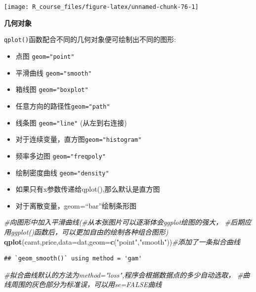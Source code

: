 \documentclass[]{article}
\newenvironment{Shaded}{\begin{snugshade}}{\end{snugshade}}
\newcommand{\KeywordTok}[1]{\textcolor[rgb]{0.13,0.29,0.53}{\textbf{{#1}}}}
\newcommand{\DataTypeTok}[1]{\textcolor[rgb]{0.13,0.29,0.53}{{#1}}}
\newcommand{\StringTok}[1]{\textcolor[rgb]{0.31,0.60,0.02}{{#1}}}
\newcommand{\CommentTok}[1]{\textcolor[rgb]{0.56,0.35,0.01}{\textit{{#1}}}}
\newcommand{\NormalTok}[1]{{#1}}
\providecommand{\tightlist}{%
  \setlength{\itemsep}{0pt}\setlength{\parskip}{0pt}}
\numberwithin{figure}{section}
\numberwithin{table}{section}
\theoremstyle{definition}
\theoremstyle{definition}
\theoremstyle{definition}
\theoremstyle{remark}
\begin{document}
\begin{center}\texttt{[image: R\_course\_files/figure-latex/unnamed-chunk-76-1]} \end{center}

\textbf{几何对象}

\texttt{qplot()}函数配合不同的几何对象便可绘制出不同的图形:

\begin{itemize}
\tightlist
\item
  点图 \texttt{geom="point"}\\
\item
  平滑曲线 \texttt{geom="smooth"}\\
\item
  箱线图 \texttt{geom="boxplot"}
\item
  任意方向的路径性\texttt{geom="path"}\\
\item
  线条图 \texttt{geom="line"} (从左到右连接)
\item
  对于连续变量，直方图\texttt{geom="histogram"}\\
\item
  频率多边图 \texttt{geom="freqpoly"}
\item
  绘制密度曲线 \texttt{geom="density"}
\item
  如果只有x参数传递给qplot(),那么默认是直方图
\item
  对于离散变量，geom=``bar''绘制条形图
\end{itemize}

\begin{Shaded}
\begin{Highlighting}[]
\CommentTok{#向图形中加入平滑曲线(#从本张图片可以逐渐体会ggplot绘图的强大，}
\CommentTok{#后期应用ggplot()函数后，可以更加自由的绘制各种组合图形)}
\KeywordTok{qplot}\NormalTok{(carat,price,}\DataTypeTok{data=}\NormalTok{dat,}\DataTypeTok{geom=}\KeywordTok{c}\NormalTok{(}\StringTok{"point"}\NormalTok{,}\StringTok{"smooth"}\NormalTok{))}\CommentTok{#添加了一条拟合曲线}
\end{Highlighting}
\end{Shaded}

\begin{verbatim}
## `geom_smooth()` using method = 'gam'
\end{verbatim}

\begin{Shaded}
\begin{Highlighting}[]
\CommentTok{#拟合曲线默认的方法为method="loss",程序会根据数据点的多少自动选取，}
\CommentTok{#曲线周围的灰色部分为标准误，可以用se=FALSE曲线}
\end{Highlighting}
\end{Shaded}
\end{document}
